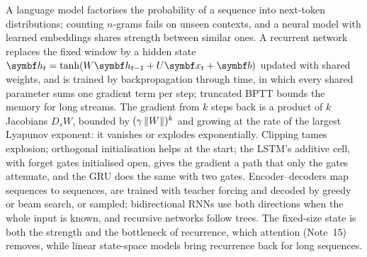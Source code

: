 \documentclass[11pt]{article}
\newcommand{\hv}{\vect{h}}
\newcommand{\bv}{\vect{b}}
\begin{document}
\begin{keyidea}[Summary]
A language model factorises the probability of a sequence into next-token distributions; counting $n$-grams fails on
unseen contexts, and a neural model with learned embeddings shares strength between similar ones. A recurrent network
replaces the fixed window by a hidden state $\hv_t = \tanh(W\hv_{t-1} + U\x_t + \bv)$ updated with shared weights, and is
trained by backpropagation through time, in which every shared parameter sums one gradient term per step; truncated BPTT
bounds the memory for long streams. The gradient from $k$ steps back is a product of $k$ Jacobians $D_sW$, bounded by
$(\gamma\left\lVert W \right\rVert)^k$ and growing at the rate of the largest Lyapunov exponent: it vanishes or explodes exponentially.
Clipping tames explosion; orthogonal initialisation helps at the start; the LSTM's additive cell, with forget gates
initialised open, gives the gradient a path that only the gates attenuate, and the GRU does the same with two gates.
Encoder--decoders map sequences to sequences, are trained with teacher forcing and decoded by greedy or beam search, or
sampled; bidirectional RNNs use both directions when the whole input is known, and recursive networks follow trees. The
fixed-size state is both the strength and the bottleneck of recurrence, which attention (Note~15) removes, while linear
state-space models bring recurrence back for long sequences.
\end{keyidea}
\end{document}
